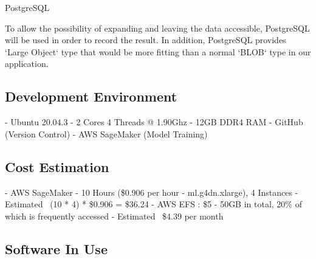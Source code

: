 \documentclass[conference]{IEEEtran}
\begin{document}
\begin{center}
PostgreSQL
\end{center}
To allow the possibility of expanding and leaving the data accessible, PostgreSQL will be used in order to record the result. In addition, PostgreSQL provides `Large Object` type that would be more fitting than a normal `BLOB` type in our application.

\subsection{Development Environment}
\noindent
- Ubuntu 20.04.3
\newline
- 2 Cores 4 Threads @ 1.90Ghz
\newline
- 12GB DDR4 RAM
\newline
- GitHub (Version Control)
\newline
- AWS SageMaker (Model Training)
  
\subsection{Cost Estimation}
\noindent
- AWS SageMaker
\newline
- 10 Hours (\$0.906 per hour - ml.g4dn.xlarge), 4 Instances
\newline
- Estimated ~(10 * 4) * \$0.906 = \$36.24
\newline
\newline
- AWS EFS : \$5
\newline
- 50GB in total, 20\% of which is frequently accessed
\newline
- Estimated ~\$4.39 per month
  
\subsection{Software In Use}
\end{document}
